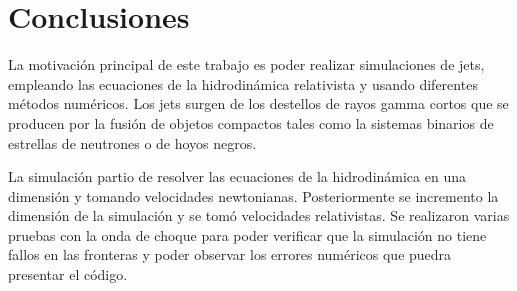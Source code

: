 \documentclass[12pt,a4paper]{book}
\begin{document}






\chapter{Conclusiones}

La motivación principal de este trabajo es poder realizar simulaciones de jets, empleando las ecuaciones de la hidrodinámica relativista y usando diferentes métodos numéricos. Los jets surgen de los destellos de rayos gamma cortos que se producen por la fusión de objetos compactos tales como la sistemas binarios de estrellas de neutrones o de hoyos negros. 

La simulación partio de resolver las ecuaciones de la hidrodinámica en una dimensión y tomando velocidades newtonianas. Posteriormente se incremento la dimensión de la simulación y se tomó velocidades relativistas. Se realizaron varias pruebas con la onda de choque para poder verificar que la simulación no tiene fallos en las fronteras y poder observar los errores numéricos que puedra presentar el código.
\end{document}
